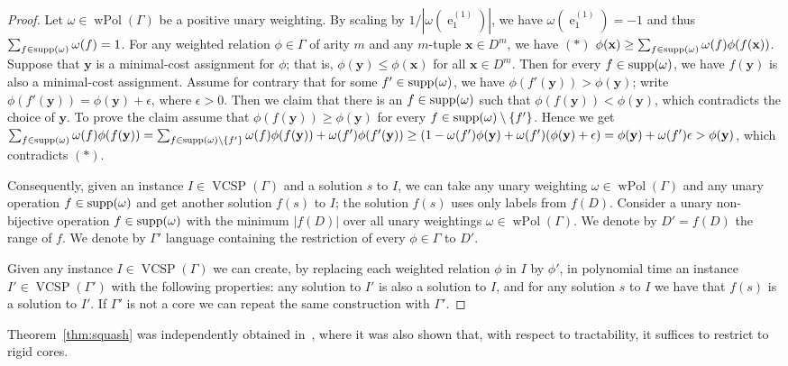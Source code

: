 \documentclass[11pt, reqno]{article}
\DeclareMathOperator{\proj}{\ensuremath{e}}
\DeclareMathOperator{\wpol}{wPol}
\newcommand{\tup}[1]{\ensuremath{\mathbf #1}}
\DeclareMathOperator{\supp}{{\rm supp}}
\DeclareMathOperator{\VCSP}{VCSP}
\theoremstyle{remark}
\begin{document}
\begin{proof}
Let $\omega\in\wpol(\Gamma)$  be a positive unary weighting. By scaling by
$1/|\omega(\proj^{(1)}_1)|$, we have 
$\omega(\proj^{(1)}_1)=-1$ and thus $\sum_{f\in\supp(\omega)}\omega(f)=1$. For
any weighted relation $\phi\in\Gamma$ of arity $m$ and any $m$-tuple
$\tup{x}\in
D^m$, we have $(\ast)$
$\phi(\tup{x})\geq\sum_{f\in\supp(\omega)}\omega(f)\phi(f(\tup{x}))$. Suppose
that $\tup{y}$ is a
minimal-cost assignment for $\phi$; that is, $\phi(\tup{y})\leq\phi(\tup{x})$ for all
$\tup{x}\in
D^m$. Then for every $f\in\supp(\omega)$, we have $f(\tup{y})$ is also a minimal-cost
assignment. Assume for contrary that for some $f'\in\supp(\omega)$, we have
$\phi(f'(\tup{y}))>\phi(\tup{y})$; write $\phi(f'(\tup{y}))=\phi(\tup{y})+\epsilon$, where $\epsilon>0$.
Then we claim that there is an $f\in\supp(\omega)$ such that
$\phi(f(\tup{y}))<\phi(\tup{y})$, which contradicts the choice of $\tup{y}$. To prove the claim
assume that $\phi(f(\tup{y}))\geq\phi(\tup{y})$ for every
$f\in\supp(\omega)\setminus\{f'\}$. Hence we get
$\sum_{f\in\supp(\omega)}\omega(f)\phi(f(\tup{y})) =
\sum_{f\in\supp(\omega)\setminus\{f'\}}\omega(f)\phi(f(\tup{y}))+\omega(f')\phi(f'(\tup{y}))
\geq (1-\omega(f')\phi(\tup{y})+\omega(f')(\phi(\tup{y})+\epsilon) =
\phi(\tup{y})+\omega(f')\epsilon>\phi(\tup{y})$, which contradicts $(\ast)$.

Consequently, given an instance $I\in\VCSP(\Gamma)$ and a solution $s$ to
$I$, we can take any unary weighting $\omega\in\wpol(\Gamma)$ and any unary operation
$f\in\supp(\omega)$ and get another solution $f(s)$ to $I$; the solution
$f(s)$ uses only labels from $f(D)$.
%
Consider a unary non-bijective operation $f\in\supp(\omega)$ with the minimum
$|f(D)|$ over all unary weightings $\omega\in\wpol(\Gamma)$.
We denote by $D'=f(D)$ the range of $f$. We denote by $\Gamma'$ language
containing the restriction of every $\phi\in\Gamma$ to $D'$.

Given any instance $I\in\VCSP(\Gamma)$ we can create, by replacing
each weighted relation $\phi$ in $I$ by $\phi'$, in polynomial time an instance
$I'\in\VCSP(\Gamma')$ with the following properties: any solution to $I'$ is
also a solution to $I$, and for any solution $s$ to $I$ we have that $f(s)$ is a
solution to $I'$. If $\Gamma'$ is not a core we can repeat the same construction
with $\Gamma'$.
%
\end{proof}

Theorem~\ref{thm:squash} was independently obtained
in~\cite{Kozik15:icalp}, where it was also shown that, with respect to
tractability, it suffices to restrict to rigid cores.
\end{document}
